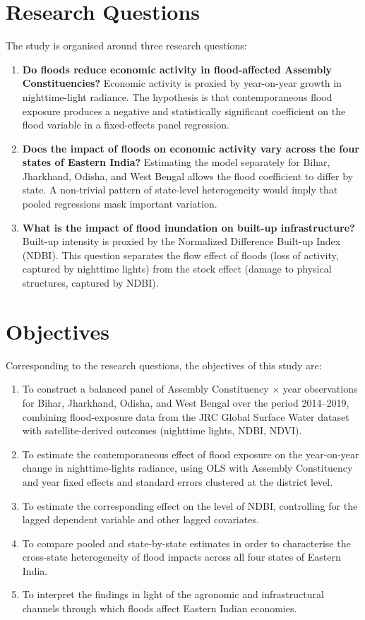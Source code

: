 \documentclass[12pt,a4paper,oneside]{report}
\begin{document}
\section{Research Questions}
The study is organised around three research questions:
\begin{enumerate}[leftmargin=2em,itemsep=4pt]
\item \textbf{Do floods reduce economic activity in flood-affected Assembly Constituencies?} Economic activity is proxied by year-on-year growth in nighttime-light radiance. The hypothesis is that contemporaneous flood exposure produces a negative and statistically significant coefficient on the flood variable in a fixed-effects panel regression.
\item \textbf{Does the impact of floods on economic activity vary across the four states of Eastern India?} Estimating the model separately for Bihar, Jharkhand, Odisha, and West Bengal allows the flood coefficient to differ by state. A non-trivial pattern of state-level heterogeneity would imply that pooled regressions mask important variation.
\item \textbf{What is the impact of flood inundation on built-up infrastructure?} Built-up intensity is proxied by the Normalized Difference Built-up Index (NDBI). This question separates the flow effect of floods (loss of activity, captured by nighttime lights) from the stock effect (damage to physical structures, captured by NDBI).
\end{enumerate}

\section{Objectives}
Corresponding to the research questions, the objectives of this study are:
\begin{enumerate}[label=(\roman*),leftmargin=2.2em,itemsep=4pt]
\item To construct a balanced panel of Assembly Constituency $\times$ year observations for Bihar, Jharkhand, Odisha, and West Bengal over the period 2014--2019, combining flood-exposure data from the JRC Global Surface Water dataset with satellite-derived outcomes (nighttime lights, NDBI, NDVI).
\item To estimate the contemporaneous effect of flood exposure on the year-on-year change in nighttime-lights radiance, using OLS with Assembly Constituency and year fixed effects and standard errors clustered at the district level.
\item To estimate the corresponding effect on the level of NDBI, controlling for the lagged dependent variable and other lagged covariates.
\item To compare pooled and state-by-state estimates in order to characterise the cross-state heterogeneity of flood impacts across all four states of Eastern India.
\item To interpret the findings in light of the agronomic and infrastructural channels through which floods affect Eastern Indian economies.
\end{enumerate}
\end{document}
